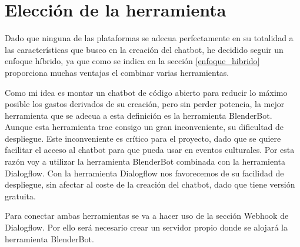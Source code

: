 \section{Elección de la herramienta}

Dado que ninguna de las plataformas se adecua perfectamente en su totalidad a las características que busco en la creación del chatbot, he decidido seguir un enfoque híbrido, ya que como se indica en la sección \ref{enfoque_hibrido} proporciona muchas ventajas el combinar varias herramientas.

Como mi idea es montar un chatbot de código abierto para reducir lo máximo posible los gastos derivados de su creación, pero sin perder potencia, la mejor herramienta que se adecua a esta definición es la herramienta BlenderBot. Aunque esta herramienta trae consigo un gran inconveniente, su dificultad de despliegue. Este inconveniente es crítico para el proyecto, dado que se quiere facilitar el acceso al chatbot para que pueda usar en eventos culturales. Por esta razón voy a utilizar la herramienta BlenderBot combinada con la herramienta Dialogflow. Con la herramienta Dialogflow nos favorecemos de su facilidad de despliegue, sin afectar al coste de la creación del chatbot, dado que tiene versión gratuita.

Para conectar ambas herramientas se va a hacer uso de la sección Webhook de Dialogflow. Por ello será necesario crear un servidor propio donde se alojará la herramienta BlenderBot.
